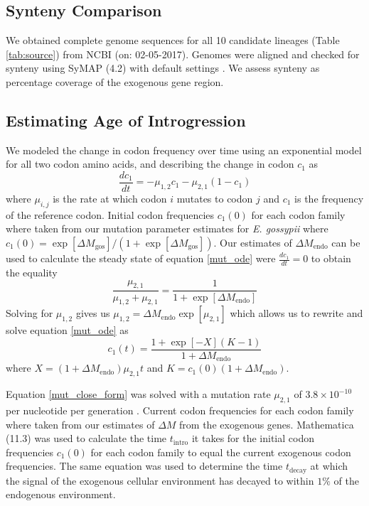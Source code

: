 \documentclass{bmcart}
\newcommand{\gossypii}{\textit{E. gossypii}\xspace}
\newcommand{\DM}{\ensuremath{{\Delta M}}\xspace}
\begin{document}
\subsection*{Synteny Comparison}
We obtained complete genome sequences for all 10 candidate lineages (Table \ref{tab:source}) from NCBI (on: 02-05-2017).
Genomes were aligned and checked for synteny using SyMAP (4.2) with default settings \citep{soderlund2006, soderlund2011}.
We assess synteny as percentage coverage of the exogenous gene region.

\subsection*{Estimating Age of Introgression}
We modeled the change in codon frequency over time using an exponential model for all two codon amino acids, and describing the change in codon $c_1$ as
\begin{equation}
\frac{d c_1}{d t} = -\mu_{1,2}c_1 - \mu_{2,1}(1-c_1)
\label{mut_ode}
\end{equation}
where $\mu_{i,j}$ is the rate at which codon $i$ mutates to codon $j$ and $c_1$ is the frequency of the reference codon.
Initial codon frequencies $c_1(0)$ for each codon family where taken from our mutation parameter estimates for \gossypii where $c_1(0) = \exp[\DM_\text{gos}]/(1+\exp[\DM_\text{gos}])$. 
Our estimates of $\DM_\text{endo}$ can be used to calculate the steady state of equation \ref{mut_ode} were $\frac{d c_1}{d t} = 0$ to obtain the equality
\begin{equation}
\frac{\mu_{2,1}}{\mu_{1,2} + \mu_{2,1}} = \frac{1}{1+\exp[\DM_\text{endo}]}
\end{equation}
Solving for $\mu_{1,2}$ gives us $\mu_{1,2} = \DM_\text{endo}\exp[\mu_{2,1}]$ which allows us to rewrite and solve equation \ref{mut_ode} as
\begin{equation}
c_1(t) = \frac{ 1 + \exp[-X](K-1) }{ 1+\DM_\text{endo} }
\label{mut_close_form}
\end{equation}
where $X = (1+\DM_\text{endo})\mu_{2,1}t$ and $K = c_1(0)(1+\DM_\text{endo}) $.

Equation \ref{mut_close_form} was solved with a mutation rate $\mu_{2,1}$ of $3.8\times 10^{-10}$ per nucleotide per generation \citep{lang2008}. 
Current codon frequencies for each codon family where taken from our estimates of \DM from the exogenous genes.
Mathematica (11.3) \citep{Mathematica11} was used to calculate the time $t_\text{intro}$ it takes for the initial codon frequencies $c_1(0)$ for each codon family to equal the current exogenous codon frequencies.
The same equation was used to determine the time $t_\text{decay}$ at which the signal of the exogenous cellular environment has decayed to within $1 \%$ of the endogenous environment.
\end{document}
